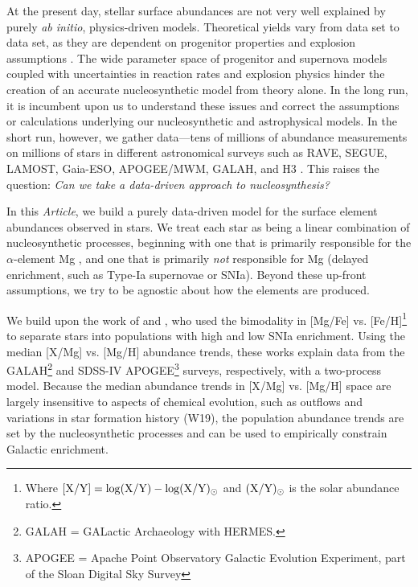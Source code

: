 \documentclass[modern, linenumbers]{aastex631}
\newcommand{\documentname}{\textsl{Article}}
\begin{document}
At the present day, stellar surface abundances are not very well explained by purely \textsl{ab initio}, physics-driven models.
Theoretical yields vary from data set to data set, as they are dependent on progenitor properties and explosion assumptions \citep[e.g.,][]{rybizki2017, blancato2019, buck2021, griffith2021b}. 
The wide parameter space of progenitor and supernova models coupled with uncertainties in reaction rates and explosion physics hinder the creation of an accurate nucleosynthetic model from theory alone.
In the long run, it is incumbent upon us to understand these issues and correct the assumptions or calculations underlying our nucleosynthetic and astrophysical models.
In the short run, however, we gather data---tens of millions of abundance measurements on millions of stars in different astronomical surveys such as RAVE, SEGUE, LAMOST, Gaia-ESO, APOGEE/MWM, GALAH, and H3 \citep{steinmetz2006, yanny2009, gilmore2012, desilva2015, luo2015, majewski2017, conroy2019}.
This raises the question: \emph{Can we take a data-driven approach to nucleosynthesis?}

In this \documentname{}, we build a purely data-driven model for the surface element abundances observed in stars.
We treat each star as being a linear combination of nucleosynthetic processes, beginning with one that is primarily responsible for the $\alpha$-element Mg \citep[prompt enrichment, such as core-collapse supernovae or CCSN, e.g.,][]{andrews2017}, and one that is primarily \emph{not} responsible for Mg (delayed enrichment, such as Type-Ia supernovae or SNIa).
Beyond these up-front assumptions, we try to be agnostic about how the elements are produced.

We build upon the work of \citet[][hereafter G22]{griffith2019, griffith2022} and \citet[][hereafter W19, W22]{weinberg2019, weinberg2022}, who used the bimodality in [Mg/Fe] vs. [Fe/H]\footnote{Where $[{\rm X}/{\rm Y}] = \log({\rm X}/{\rm Y}) - \log({\rm X}/{\rm Y})_{\odot}$ and $({\rm X}/{\rm Y})_{\odot}$ is the solar abundance ratio.} \citep[e.g.,][]{fuhrmann1998, bensby2003, adibekyan2012} to separate stars into populations with high and low SNIa enrichment. Using the median [X/Mg] vs. [Mg/H] abundance trends, these works explain data from the GALAH\footnote{GALAH = GALactic Archaeology with HERMES.} and SDSS-IV APOGEE\footnote{APOGEE = Apache Point Observatory Galactic Evolution Experiment, part of the Sloan Digital Sky Survey} surveys, respectively, with a two-process model. Because the median abundance trends in [X/Mg] vs. [Mg/H] space are largely insensitive to aspects of chemical evolution, such as outflows and variations in star formation history (W19), the population abundance trends are set by the nucleosynthetic processes and can be used to empirically constrain Galactic enrichment. 
\end{document}
